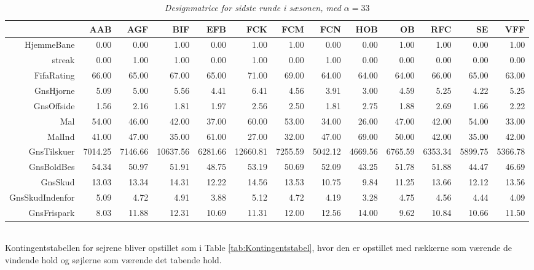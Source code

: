 \documentclass[11pt,a4paper]{article}
\begin{document}
\begin{table}[ht]
\centering
\begin{adjustbox}{max width=\textwidth}
\begin{tabular}{|r|rrrrrrrrrrrr|}
  \hline
 & AAB & AGF & BIF & EFB & FCK & FCM & FCN & HOB & OB & RFC & SE & VFF \\ 
  \hline
HjemmeBane & 0.00 & 0.00 & 1.00 & 0.00 & 1.00 & 1.00 & 0.00 & 0.00 & 1.00 & 1.00 & 0.00 & 1.00 \\ 
  streak & 0.00 & 1.00 & 1.00 & 0.00 & 1.00 & 0.00 & 1.00 & 0.00 & 0.00 & 0.00 & 0.00 & 0.00 \\ 
  FifaRating & 66.00 & 65.00 & 67.00 & 65.00 & 71.00 & 69.00 & 64.00 & 64.00 & 64.00 & 66.00 & 65.00 & 63.00 \\ 
  GnsHjorne & 5.09 & 5.00 & 5.56 & 4.41 & 6.41 & 4.56 & 3.91 & 3.00 & 4.59 & 5.25 & 4.22 & 5.25 \\ 
  GnsOffside & 1.56 & 2.16 & 1.81 & 1.97 & 2.56 & 2.50 & 1.81 & 2.75 & 1.88 & 2.69 & 1.66 & 2.22 \\ 
  Mal & 54.00 & 46.00 & 42.00 & 37.00 & 60.00 & 53.00 & 34.00 & 26.00 & 47.00 & 42.00 & 54.00 & 33.00 \\ 
  MalInd & 41.00 & 47.00 & 35.00 & 61.00 & 27.00 & 32.00 & 47.00 & 69.00 & 50.00 & 42.00 & 35.00 & 42.00 \\ 
  GnsTilskuer & 7014.25 & 7146.66 & 10637.56 & 6281.66 & 12660.81 & 7255.59 & 5042.12 & 4669.56 & 6765.59 & 6353.34 & 5899.75 & 5366.78 \\ 
  GnsBoldBes & 54.34 & 50.97 & 51.91 & 48.75 & 53.19 & 50.69 & 52.09 & 43.25 & 51.78 & 51.88 & 44.47 & 46.69 \\ 
  GnsSkud & 13.03 & 13.34 & 14.31 & 12.22 & 14.56 & 13.53 & 10.75 & 9.84 & 11.25 & 13.66 & 12.12 & 13.56 \\ 
  GnsSkudIndenfor & 5.09 & 4.72 & 4.91 & 3.88 & 5.12 & 4.72 & 4.19 & 3.28 & 4.75 & 4.56 & 4.44 & 4.09 \\ 
  GnsFrispark & 8.03 & 11.88 & 12.31 & 10.69 & 11.31 & 12.00 & 12.56 & 14.00 & 9.62 & 10.84 & 10.66 & 11.50 \\ 
   \hline
\end{tabular}
\end{adjustbox}
\caption{\label{tab:Designmatrice}\textit{Designmatrice for sidste runde i sæsonen, med $\alpha = 33$}}
\end{table}
\\Kontingentstabellen for sejrene bliver opstillet som i Table \ref{tab:Kontingentstabel}, hvor den er opstillet med rækkerne som værende de vindende hold og søjlerne som værende det tabende hold.
\end{document}
